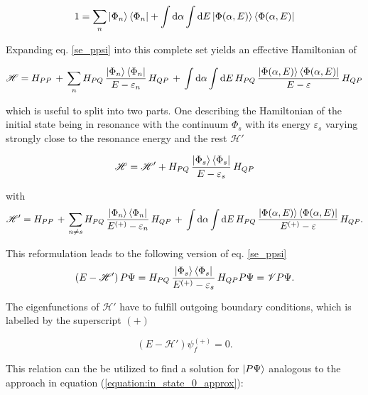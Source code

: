 \begin{equation}
  1 = \sum\limits_n \ket{\Phi_n}\bra{\Phi_n} + \int \mathrm{d}\alpha \int \mathrm{d}E
      \ket{\Phi(\alpha,E)}\bra{\Phi(\alpha,E)} \label{feshbach_1}
\end{equation}

Expanding eq. \ref{se_ppsi} into this complete set yields an effective Hamiltonian
of

\begin{equation}
  \mathscr{H} = H_{PP}\, + \,
  \sum\limits_n H_{PQ} \,\frac{\ket{\Phi_n}\bra{\Phi_n}}{E-\varepsilon_n}\, H_{QP} \,+\,
  \int \mathrm{d}\alpha \int\mathrm{d}E \,H_{PQ} \,
  \frac{\ket{\Phi(\alpha,E)}\bra{\Phi(\alpha,E)}}{E-\varepsilon} \, H_{QP}
\end{equation}

which is useful to split into two parts. One describing the Hamiltonian of the
initial state being in resonance with the continuum $\Phi_s$ with its energy
$\varepsilon_s$ varying strongly close to the resonance energy and the rest
$\mathscr{H}'$

\begin{equation}
  \mathscr{H} = \mathscr{H}' + H_{PQ} \,\frac{\ket{\Phi_s}\bra{\Phi_s}}{E-\varepsilon_s}\, H_{QP}
\end{equation}

with
\begin{equation}
  \mathscr{H}' = H_{PP}\, + \,
  \sum\limits_{n\ne s} H_{PQ} \,\frac{\ket{\Phi_n}\bra{\Phi_n}}{E^{(+)}-\varepsilon_n}
  \, H_{QP} \,+\,
  \int \mathrm{d}\alpha \int\mathrm{d}E \,H_{PQ} \,
  \frac{\ket{\Phi(\alpha,E)}\bra{\Phi(\alpha,E)}}{E^{(+)}-\varepsilon} \, H_{QP} .
\end{equation}

This reformulation leads to the following version of eq. \ref{se_ppsi}
\begin{equation}
  (E - \mathscr{H}')\, P \Psi =
   H_{PQ} \,\frac{\ket{\Phi_s}\bra{\Phi_s}}{E^{(+)}-\varepsilon_s}\, H_{QP} P \Psi = \mathscr{V} P \Psi.
\end{equation}

The eigenfunctions of $\mathscr{H}'$ have to fulfill outgoing boundary conditions,
which is labelled by the superscript $(+)$

\begin{equation}
  (E-\mathscr{H}') \psi_f^{(+)} = 0 \label{sol_outg} .
\end{equation}

This relation can the be utilized to find a solution for $\ket{P \Psi}$ analogous
to the approach in equation (\ref{equation:in_state_0_approx}):

